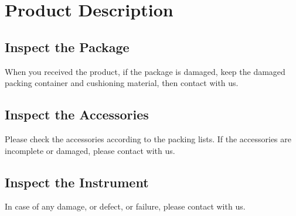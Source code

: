 \chapter{\heiti Product Description}
{
\fancyhf{}
\renewcommand{\headrulewidth}{2.4pt}
\renewcommand{\footrulewidth}{2.4pt}
\chead{}
\cfoot{}
\fancyfoot[RO,LE]{\xiaosi\textbf{\thepage}}
}


\pagestyle{fancy}
\renewcommand{\headrulewidth}{1.5pt}
\renewcommand{\footrulewidth}{1.5pt}
\chead{}
\cfoot{}
\fancyfoot[RO,LE]{\xiaosi\textbf{\thepage}}

\setcounter{page}{1}
\setmainfont{Times New Roman}
\section{Inspect the Package}
When you received the product, if the package is damaged, keep the damaged packing container and cushioning material, then contact with us. 

\section{\heiti Inspect the Accessories}
Please check the accessories according to the packing lists. If the accessories are incomplete or damaged, please contact with us.

\section{\heiti Inspect the Instrument}
In case of any damage, or defect, or failure, please contact with us.

